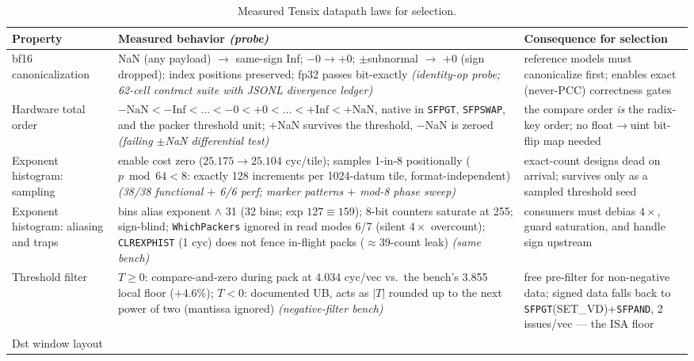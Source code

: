 \begin{table}[t]
\centering
\caption{Measured Tensix datapath laws for selection.}
\label{tab:characterization}
\scriptsize
\setlength{\tabcolsep}{4pt}
\begin{tabular}{@{}p{2.0cm}p{9.6cm}p{5.5cm}@{}}
\toprule
\textbf{Property} & \textbf{Measured behavior} \emph{(probe)} & \textbf{Consequence for selection} \\
\midrule
bf16 canonicalization &
NaN (any payload) $\rightarrow$ same-sign Inf; $-0\rightarrow+0$;
$\pm$subnormal $\rightarrow$ $+0$ (sign dropped); index positions preserved;
fp32 passes bit-exactly \emph{(identity-op probe; 62-cell contract suite
with JSONL divergence ledger)} &
reference models must canonicalize first; enables exact (never-PCC)
correctness gates \\
\addlinespace
Hardware total order &
$-\mathrm{NaN}<-\mathrm{Inf}<\dots<-0<+0<\dots<+\mathrm{Inf}<+\mathrm{NaN}$,
native in \texttt{SFPGT}, \texttt{SFPSWAP}, and the packer threshold unit;
$+$NaN survives the threshold, $-$NaN is zeroed \emph{(failing $\pm$NaN
differential test)} &
the compare order \emph{is} the radix-key order; no float$\to$uint bit-flip
map needed \\
\addlinespace
Exponent histogram: sampling &
enable cost zero ($25.175\rightarrow25.104$ cyc/tile); samples 1-in-8
positionally ($p \bmod 64 < 8$: exactly 128 increments per 1024-datum tile,
format-independent) \emph{(38/38 functional $+$ 6/6 perf; marker patterns
$+$ mod-8 phase sweep)} &
exact-count designs dead on arrival; survives only as a sampled threshold
seed \\
\addlinespace
Exponent histogram: aliasing and traps &
bins alias exponent $\wedge$ 31 (32 bins; exp $127\equiv159$); 8-bit
counters saturate at 255; sign-blind; \texttt{WhichPackers} ignored in read
modes 6/7 (silent $4\times$ overcount); \texttt{CLREXPHIST} (1 cyc) does not
fence in-flight packs ($\approx$39-count leak) \emph{(same bench)} &
consumers must debias $4\times$, guard saturation, and handle sign upstream \\
\addlinespace
Threshold filter &
$T\geq0$: compare-and-zero during pack at 4.034 cyc/vec vs.\ the bench's
3.855 local floor ($+4.6\%$); $T<0$: documented UB, acts as $|T|$ rounded up
to the next power of two (mantissa ignored) \emph{(negative-filter bench)} &
free pre-filter for non-negative data; signed data falls back to
\texttt{SFPGT}(SET\_VD)$+$\texttt{SFPAND}, 2 issues/vec --- the ISA floor \\
\addlinespace
Dst window layout &

\end{tabular}
\end{table}
